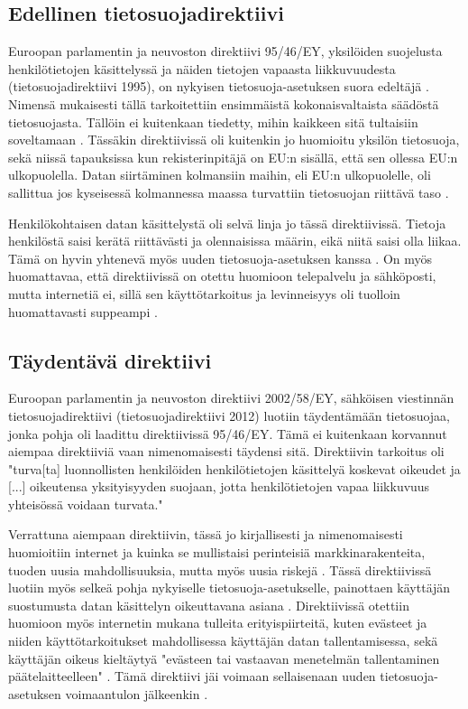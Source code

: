 \documentclass[finnish]{tktltiki}
\begin{document}
\subsection{Edellinen tietosuojadirektiivi}

Euroopan parlamentin ja neuvoston direktiivi 95/46/EY, yksilöiden suojelusta henkilötietojen käsittelyssä ja näiden tietojen vapaasta liikkuvuudesta (tietosuojadirektiivi 1995), on nykyisen tietosuoja-asetuksen suora edeltäjä \cite{eu95,eu2016}. Nimensä mukaisesti tällä tarkoitettiin ensimmäistä kokonaisvaltaista säädöstä tietosuojasta. Tällöin ei kuitenkaan tiedetty, mihin kaikkeen sitä tultaisiin soveltamaan \cite{eu2016}. Tässäkin direktiivissä oli kuitenkin jo huomioitu yksilön tietosuoja, sekä niissä tapauksissa kun rekisterinpitäjä on EU:n sisällä, että sen ollessa EU:n ulkopuolella. Datan siirtäminen kolmansiin maihin, eli EU:n ulkopuolelle, oli sallittua jos kyseisessä kolmannessa maassa turvattiin tietosuojan riittävä taso \cite{eu95,safeharbor}.

Henkilökohtaisen datan käsittelystä oli selvä linja jo tässä direktiivissä. Tietoja henkilöstä saisi kerätä riittävästi ja olennaisissa määrin, eikä niitä saisi olla liikaa. Tämä on hyvin yhtenevä myös uuden tietosuoja-asetuksen kanssa \cite{eu95,eu2016,tikkinen}. On myös huomattavaa, että direktiivissä on otettu huomioon telepalvelu ja sähköposti, mutta internetiä ei, sillä sen käyttötarkoitus ja levinneisyys oli tuolloin huomattavasti suppeampi \cite{eu95}.

\newpage
\subsection{Täydentävä direktiivi}

Euroopan parlamentin ja neuvoston direktiivi 2002/58/EY, sähköisen viestinnän tietosuojadirektiivi (tietosuojadirektiivi 2012) luotiin täydentämään tietosuojaa, jonka pohja oli laadittu direktiivissä 95/46/EY. Tämä ei kuitenkaan korvannut aiempaa direktiiviä vaan nimenomaisesti täydensi sitä. Direktiivin tarkoitus oli "turva[ta] luonnollisten henkilöiden henkilötietojen käsittelyä koskevat oikeudet ja [...] oikeutensa yksityisyyden suojaan, jotta henkilötietojen vapaa liikkuvuus yhteisössä voidaan turvata." \cite{eu2002} 

Verrattuna aiempaan direktiivin, tässä jo kirjallisesti ja nimenomaisesti huomioitiin internet ja kuinka se mullistaisi perinteisiä markkinarakenteita, tuoden uusia mahdollisuuksia, mutta myös uusia riskejä \cite{eu2002}. Tässä direktiivissä luotiin myös selkeä pohja nykyiselle tietosuoja-asetukselle, painottaen käyttäjän suostumusta datan käsittelyn oikeuttavana asiana \cite{eu2002,tikkinen}. Direktiivissä otettiin huomioon myös internetin mukana tulleita erityispiirteitä, kuten evästeet ja niiden käyttötarkoitukset mahdollisessa käyttäjän datan tallentamisessa, sekä käyttäjän oikeus kieltäytyä "evästeen tai vastaavan menetelmän tallentaminen päätelaitteelleen" \cite{eu2002}. Tämä direktiivi jäi voimaan sellaisenaan uuden tietosuoja-asetuksen voimaantulon jälkeenkin \cite{eu2016}.
\end{document}
